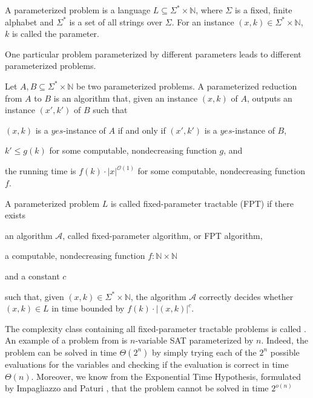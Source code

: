 \begin{definition}
    A parameterized problem is a language $L \subseteq \Sigma^* \times \mathbb{N}$, where
    $\Sigma$ is a fixed, finite alphabet and $\Sigma^*$ is a set of all strings over $\Sigma$.
    For an instance $(x, k) \in \Sigma^* \times \mathbb{N}$, $k$ is called the parameter.
\end{definition}

One particular problem parameterized by different parameters leads to different parameterized problems.

\begin{definition}
    Let $A,B \subseteq \Sigma^* \times \mathbb{N}$ be two parameterized problems.
    A parameterized reduction from $A$ to $B$ is an algorithm that, given an instance $(x, k)$ of $A$,
    outputs an instance $(x', k')$ of $B$ such that
    \begin{description}
        \item $(x, k)$ is a $yes$-instance of $A$ if and only if $(x', k')$ is a $yes$-instance of $B$,
        \item $k' \leq g(k)$ for some computable, nondecreasing function $g$, and
        \item the running time is $f(k) \cdot |x|^{\mathcal{O}(1)}$ for some computable, nondecreasing function $f$.
    \end{description}
\end{definition}

\begin{definition}[FPT]
    A parameterized problem $L$ is called fixed-parameter tractable (FPT) if there exists
    \begin{description}
        \item an algorithm $\mathcal{A}$, called fixed-parameter algorithm, or FPT algorithm,
        \item a computable, nondecreasing function $f : \mathbb{N} \times \mathbb{N}$
        \item and a constant $c$
    \end{description}
    such that, given $(x,k) \in \Sigma^* \times \mathbb{N}$,
    the algorithm $\mathcal{A}$ correctly decides whether $(x, k) \in L$ in time bounded by
    $f(k) \cdot |(x,k)|^c$.
\end{definition}

The complexity class containing all fixed-parameter tractable problems is called \FPT.
An example of a problem from \FPT is $n$-variable \textsc{SAT} parameterized by $n$.
Indeed, the problem can be solved in time $\Theta(2^n)$ by simply trying each of the $2^n$
possible evaluations for the variables and checking if the evaluation is correct in time $\Theta(n)$.
Moreover, we know from the Exponential Time Hypothesis, formulated by Impagliazzo and Paturi \cite{Impagliazzo1999},
that the problem cannot be solved in time $2^{o(n)}$


